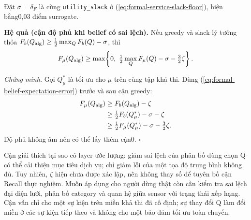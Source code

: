 Đặt $\sigma=\delta_F$ là cùng \texttt{utility\_slack} ở
(\ref{eq:formal-service-slack-floor}), hiện bằng0,03 điểm surrogate.

\begin{samepage}
\noindent\textbf{Hệ quả (cận độ phủ khi belief có sai lệch).}
Nếu greedy và slack lý tưởng thỏa
$F_b(Q_{\rm alg})\geq\tfrac12\max_Q F_b(Q)-\sigma$,
thì
\begin{equation}
 F_\mu(Q_{\rm alg})\geq
 \max\!\left\{0,\ \tfrac12\max_Q F_\mu(Q)-\sigma-
 \tfrac32\zeta\right\}.
 \label{eq:formal-belief-utility-bridge}
\end{equation}
\end{samepage}

\noindent\emph{Chứng minh.}
Gọi $Q^*_\mu$ là tối ưu cho $\mu$ trên cùng tập khả thi. Dùng
(\ref{eq:formal-belief-expectation-error}) trước và sau cận greedy:
\[
 \begin{aligned}
 F_\mu(Q_{\rm alg})
 &\geq F_b(Q_{\rm alg})-\zeta\\
 &\geq\tfrac12F_b(Q^*_\mu)-\sigma-\zeta\\
 &\geq\tfrac12F_\mu(Q^*_\mu)-\sigma-\tfrac32\zeta.
 \end{aligned}
\]
Độ phủ không âm nên có thể lấy thêm cận0. \hfill$\square$

Cận giải thích tại sao có layer ước lượng: giảm sai lệch của phân bố
dùng chọn Q có thể cải thiện mục tiêu dịch vụ; chỉ giảm lỗi của một tọa
độ trung bình không đủ. Tuy nhiên, $\zeta$ hiện chưa được xác lập, nên
không thay số để tuyên bố cận Recall thực nghiệm. Muốn áp dụng cho người
dùng thật còn cần kiểm tra sai lệch đại diện lưới, phân bố category và
quan hệ giữa sensor với trạng thái xếp hạng. Cận vẫn chỉ cho một sự
kiện trên miền khả thi đã cố định; sự thay đổi Q làm đổi miền ở các sự
kiện tiếp theo và không cho một bảo đảm tối ưu toàn chuyến.
